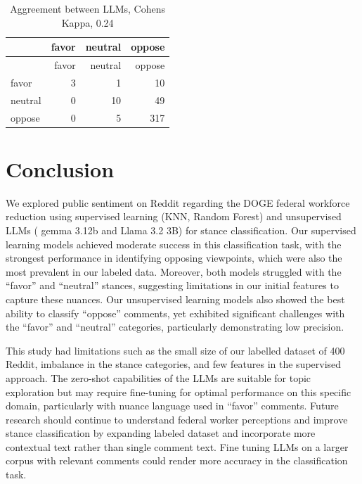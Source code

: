 \documentclass[
  12pt]{article}
\begin{document}
\begin{longtable}[]{@{}lrrr@{}}
\caption{Aggreement between LLMs, Cohens Kappa, 0.24}\tabularnewline
\toprule\noalign{}
& favor & neutral & oppose \\
\midrule\noalign{}
\endfirsthead
\toprule\noalign{}
& favor & neutral & oppose \\
\midrule\noalign{}
\endhead
\bottomrule\noalign{}
\endlastfoot
favor & 3 & 1 & 10 \\
neutral & 0 & 10 & 49 \\
oppose & 0 & 5 & 317 \\
\end{longtable}

\section{Conclusion}\label{conclusion}

We explored public sentiment on Reddit regarding the DOGE federal
workforce reduction using supervised learning (KNN, Random Forest) and
unsupervised LLMs ( gemma 3.12b and Llama 3.2 3B) for stance
classification. Our supervised learning models achieved moderate success
in this classification task, with the strongest performance in
identifying opposing viewpoints, which were also the most prevalent in
our labeled data. Moreover, both models struggled with the ``favor'' and
``neutral'' stances, suggesting limitations in our initial features to
capture these nuances. Our unsupervised learning models also showed the
best ability to classify ``oppose'' comments, yet exhibited significant
challenges with the ``favor'' and ``neutral'' categories, particularly
demonstrating low precision.

This study had limitations such as the small size of our labelled
dataset of 400 Reddit, imbalance in the stance categories, and few
features in the supervised approach. The zero-shot capabilities of the
LLMs are suitable for topic exploration but may require fine-tuning for
optimal performance on this specific domain, particularly with nuance
language used in ``favor'' comments. Future research should continue to
understand federal worker perceptions and improve stance classification
by expanding labeled dataset and incorporate more contextual text rather
than single comment text. Fine tuning LLMs on a larger corpus with
relevant comments could render more accuracy in the classification task.
\end{document}
